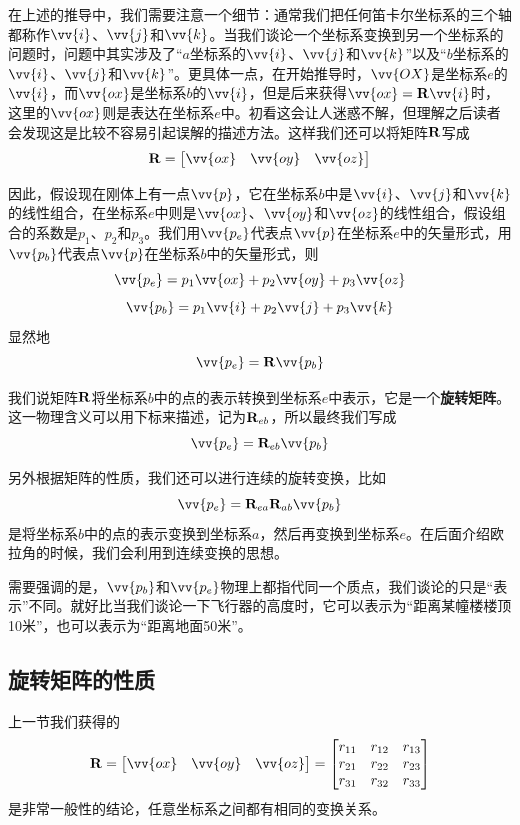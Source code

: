 \documentclass[11pt]{article}
\begin{document}
在上述的推导中，我们需要注意一个细节：通常我们把任何笛卡尔坐标系的三个轴都称作$\vv{i}$、$\vv{j}$和$\vv{k}$。当我们谈论一个坐标系变换到另一个坐标系的问题时，问题中其实涉及了“$a$坐标系的$\vv{i}$、$\vv{j}$和$\vv{k}$”以及“$b$坐标系的$\vv{i}$、$\vv{j}$和$\vv{k}$”。更具体一点，在开始推导时，$\vv{OX}$是坐标系$e$的$\vv{i}$，而$\vv{ox}$是坐标系$b$的$\vv{i}$，但是后来获得$\vv{ox} =   {\bf R} \vv{i}$时，这里的$\vv{ox}$则是表达在坐标系$e$中。初看这会让人迷惑不解，但理解之后读者会发现这是比较不容易引起误解的描述方法。这样我们还可以将矩阵${\bf R}$写成
$$
{\bf R} = \begin{bmatrix}
\vv{ox} & \vv{oy} & \vv{oz}\\
\end{bmatrix}
$$

因此，假设现在刚体上有一点$\vv{p}$，它在坐标系$b$中是$\vv{i}$、$\vv{j}$和$\vv{k}$的线性组合，在坐标系$e$中则是$\vv{ox}$、$\vv{oy}$和$\vv{oz}$的线性组合，假设组合的系数是$p_1$、$p_2$和$p_3$。我们用$\vv{p_e}$代表点$\vv{p}$在坐标系$e$中的矢量形式，用$\vv{p_b}$代表点$\vv{p}$在坐标系$b$中的矢量形式，则
$$
\vv{p_e} = p_1\vv{ox}+p_2\vv{oy}+p_3\vv{oz}
$$
$$
\vv{p_b} = p_1\vv{i}+p_2\vv{j}+p_3\vv{k}
$$
显然地
$$
\vv{p_e} = {\bf R}\vv{p_b}
$$

我们说矩阵${\bf R}$将坐标系$b$中的点的表示转换到坐标系$e$中表示，它是一个\textbf{旋转矩阵}。这一物理含义可以用下标来描述，记为${\bf R}_{eb}$，所以最终我们写成
$$
\vv{p_e} = {\bf R}_{eb}\vv{p_b}
$$

另外根据矩阵的性质，我们还可以进行连续的旋转变换，比如
$$
\vv{p_e} = {\bf R}_{ea}{\bf R}_{ab}\vv{p_b}
$$
是将坐标系$b$中的点的表示变换到坐标系$a$，然后再变换到坐标系$e$。在后面介绍欧拉角的时候，我们会利用到连续变换的思想。

需要强调的是，$\vv{p_b}$和$\vv{p_e}$物理上都指代同一个质点，我们谈论的只是“表示”不同。就好比当我们谈论一下飞行器的高度时，它可以表示为“距离某幢楼楼顶10米”，也可以表示为“距离地面50米”。

\subsection{旋转矩阵的性质}\label{sec:rotationproperties}
上一节我们获得的
$$
{\bf R} = \begin{bmatrix}
\vv{ox} & \vv{oy} & \vv{oz}\\
\end{bmatrix}
= \begin{bmatrix}
r_{11} & r_{12} & r_{13}\\
r_{21} & r_{22} & r_{23}\\
r_{31} & r_{32} & r_{33}
\end{bmatrix}
$$
是非常一般性的结论，任意坐标系之间都有相同的变换关系。
\end{document}
